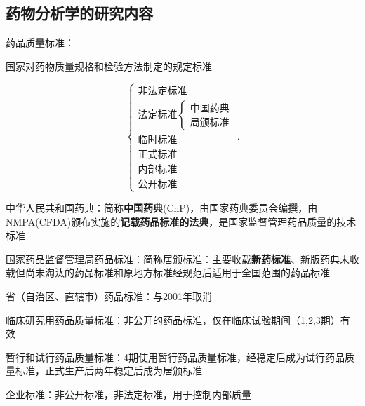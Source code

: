 \subsection{药物分析学的研究内容}%
\label{sub:药物分析学的研究内容}
\begin{notation}
    药品质量标准：

    国家对药物质量规格和检验方法制定的规定标准
\end{notation}
\[
    \begin{cases}
        \text{非法定标准}\\
        \text{法定标准}\begin{cases}
            \text{中国药典}\\
            \text{局颁标准}
        \end{cases}\\
        \text{临时标准}\\
        \text{正式标准}\\
        \text{内部标准}\\
        \text{公开标准}
    \end{cases}
.\] 
\begin{notation}
    中华人民共和国药典：简称\textbf{中国药典}(ChP)，由国家药典委员会编撰，由NMPA(CFDA)颁布实施的\textbf{记载药品标准的法典}，是国家监督管理药品质量的技术标准
\end{notation}
\begin{notation}
    国家药品监督管理局药品标准：简称居颁标准：主要收载\textbf{新药标准}、新版药典未收载但尚未淘汰的药品标准和原地方标准经规范后适用于全国范围的药品标准
\end{notation}
省（自治区、直辖市）药品标准：与2001年取消
\begin{notation}
    临床研究用药品质量标准：非公开的药品标准，仅在临床试验期间（1,2,3期）有效

    暂行和试行药品质量标准：4期使用暂行药品质量标准，经稳定后成为试行药品质量标准，正式生产后两年稳定后成为居颁标准
\end{notation}
\begin{notation}
    企业标准：非公开标准，非法定标准，用于控制内部质量
\end{notation}
